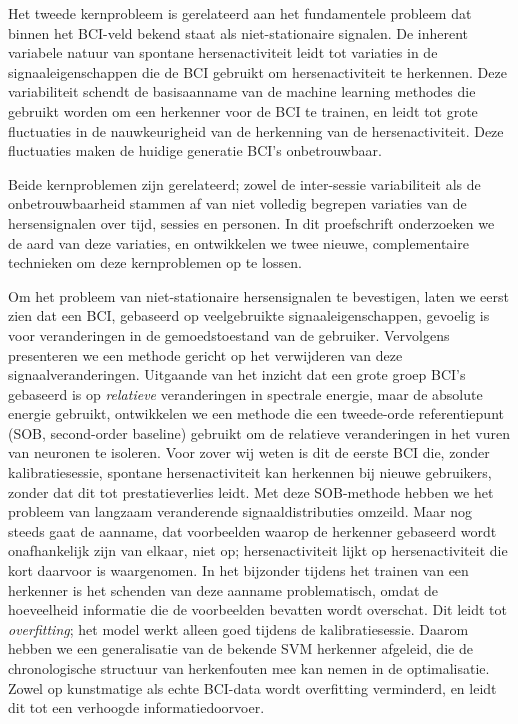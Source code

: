 Het tweede kernprobleem is gerelateerd aan het fundamentele probleem dat binnen
het BCI-veld bekend staat als niet-stationaire signalen. De inherent variabele
natuur van spontane hersenactiviteit leidt tot variaties in de
signaaleigenschappen die de BCI gebruikt om hersenactiviteit te herkennen. Deze
variabiliteit schendt de basisaanname van de machine learning methodes die
gebruikt worden om een herkenner voor de BCI te trainen, en leidt tot grote
fluctuaties in de nauwkeurigheid van de herkenning van de hersenactiviteit.
Deze fluctuaties maken de huidige generatie BCI's onbetrouwbaar.

Beide kernproblemen zijn gerelateerd; zowel de inter-sessie variabiliteit als de
onbetrouwbaarheid stammen af van niet volledig begrepen variaties van de
hersensignalen over tijd, sessies en personen. In dit proefschrift onderzoeken
we de aard van deze variaties, en ontwikkelen we twee nieuwe, complementaire
technieken om deze kernproblemen op te lossen.

Om het probleem van niet-stationaire hersensignalen te bevestigen, laten we
eerst zien dat een BCI, gebaseerd op veelgebruikte signaaleigenschappen,
gevoelig is voor veranderingen in de gemoedstoestand van de gebruiker.
%
Vervolgens presenteren we een methode gericht op het verwijderen van deze
signaalveranderingen. Uitgaande van het inzicht dat een grote groep BCI's
gebaseerd is op \emph{relatieve} veranderingen in spectrale energie, maar de
absolute energie gebruikt, ontwikkelen we een methode die een tweede-orde
referentiepunt (SOB, second-order baseline) gebruikt om de relatieve
veranderingen in het vuren van neuronen te isoleren. Voor zover wij weten is
dit de eerste BCI die, zonder kalibratiesessie, spontane hersenactiviteit kan
herkennen bij nieuwe gebruikers, zonder dat dit tot prestatieverlies leidt.
%
Met deze SOB-methode hebben we het probleem van langzaam veranderende
signaaldistributies omzeild. Maar nog steeds gaat de aanname, dat voorbeelden
waarop de herkenner gebaseerd wordt onafhankelijk zijn van elkaar, niet op;
hersenactiviteit lijkt op hersenactiviteit die kort daarvoor is waargenomen. In
het bijzonder tijdens het trainen van een herkenner is het schenden van deze
aanname problematisch, omdat de hoeveelheid informatie die de voorbeelden
bevatten wordt overschat. Dit leidt tot \emph{overfitting}; het model werkt
alleen goed tijdens de kalibratiesessie.
%
Daarom hebben we een generalisatie van de bekende \ac{SVM} herkenner afgeleid,
die de chronologische structuur van herkenfouten mee kan nemen in de
optimalisatie. Zowel op kunstmatige als echte BCI-data wordt overfitting
verminderd, en leidt dit tot een verhoogde informatiedoorvoer.


